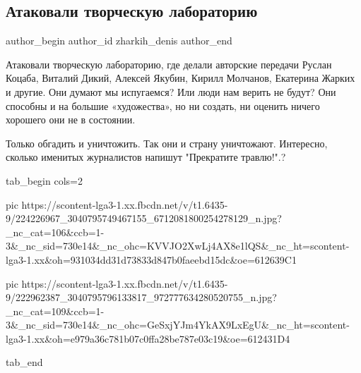  
 
 
 
 
 
\subsection{Атаковали творческую лабораторию}
\label{sec:26_07_2021.fb.zharkih_denis.1.ataka_na_laboratoriju}
 
\ifcmt
 author_begin
   author_id zharkih_denis
 author_end
\fi

Атаковали творческую лабораторию, где делали авторские передачи Руслан Коцаба,
Виталий Дикий, Алексей Якубин, Кирилл Молчанов, Екатерина Жарких и другие. Они
думают мы испугаемся? Или люди нам верить не будут? Они способны и на большие
«художества», но ни создать, ни оценить ничего хорошего они не в состоянии.

Только обгадить и уничтожить. Так они и страну уничтожают. Интересно, сколько
именитых  журналистов напишут "Прекратите травлю!".?

\ifcmt
  tab_begin cols=2

     pic https://scontent-lga3-1.xx.fbcdn.net/v/t1.6435-9/224226967_3040795749467155_6712081800254278129_n.jpg?_nc_cat=106&ccb=1-3&_nc_sid=730e14&_nc_ohc=KVVJO2XwLj4AX8e1lQS&_nc_ht=scontent-lga3-1.xx&oh=931034dd31d73833d847b0faeebd15dc&oe=612639C1

     pic https://scontent-lga3-1.xx.fbcdn.net/v/t1.6435-9/222962387_3040795796133817_972777634280520755_n.jpg?_nc_cat=109&ccb=1-3&_nc_sid=730e14&_nc_ohc=GeSxjYJm4YkAX9LxEgU&_nc_ht=scontent-lga3-1.xx&oh=e979a36c781b07c0ffa28be787e03c19&oe=612431D4

  tab_end
\fi



